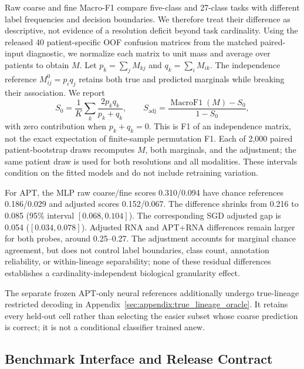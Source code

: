 \documentclass{article} %
\begin{document}
Raw coarse and fine Macro-F1 compare five-class and 27-class tasks with different
label frequencies and decision boundaries. We therefore treat their difference
as descriptive, not evidence of a resolution deficit beyond task cardinality.
Using the released 40 patient-specific OOF confusion matrices from the matched
paired-input diagnostic, we normalize each matrix to unit mass and average
over patients to obtain $M$. Let $p_k=\sum_j M_{kj}$ and
$q_k=\sum_i M_{ik}$. The independence reference $M^0_{ij}=p_iq_j$ retains both
true and predicted marginals while breaking their association. We report
\begin{equation}
S_0=\frac{1}{K}\sum_k\frac{2p_kq_k}{p_k+q_k},\qquad
S_{\mathrm{adj}}=\frac{\operatorname{MacroF1}(M)-S_0}{1-S_0},
\end{equation}
with zero contribution when $p_k+q_k=0$. This is F1 of an independence matrix,
not the exact expectation of finite-sample permutation F1. Each of 2,000 paired
patient-bootstrap draws recomputes $M$, both marginals, and the adjustment; the
same patient draw is used for both resolutions and all modalities. These
intervals condition on the fitted models and do not include retraining variation.



For APT, the MLP raw coarse/fine scores 0.310/0.094 have chance references
0.186/0.029 and adjusted scores 0.152/0.067. The difference shrinks from 0.216
to 0.085 (95\% interval $[0.068,0.104]$). The corresponding SGD adjusted gap
is 0.054 ($[0.034,0.078]$). Adjusted RNA and APT+RNA differences remain larger
for both probes, around 0.25--0.27. The adjustment accounts for marginal chance
agreement, but does not control label boundaries, class count, annotation
reliability, or within-lineage separability; none of these residual differences
establishes a cardinality-independent biological granularity effect.

The separate frozen APT-only neural references additionally undergo
true-lineage restricted decoding in Appendix~\ref{sec:appendix:true_lineage_oracle}.
It retains every held-out cell rather than selecting the easier subset whose
coarse prediction is correct; it is not a conditional classifier trained anew.

\subsection{Benchmark Interface and Release Contract}
\label{sec:appendix:benchmark_release}
\end{document}
